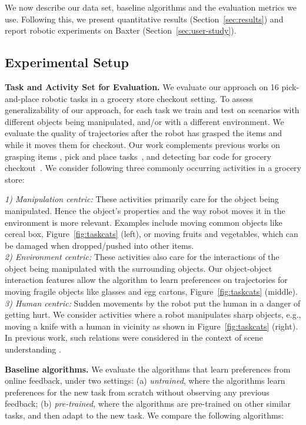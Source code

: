 We now describe our data set, baseline algorithms and the evaluation metrics we use. Following this, we present quantitative results (Section~\ref{sec:results}) 
and report robotic experiments on Baxter (Section~\ref{sec:user-study}). 

\subsection{Experimental Setup}

\textbf{Task and Activity Set for Evaluation.} We evaluate our approach on 16 pick-and-place robotic tasks in a grocery store checkout setting. To assess generalizability of our approach, for each task we train and test on scenarios with different objects being manipulated, and/or with a different environment. We evaluate the quality of trajectories after the robot has grasped the items and while it moves them for checkout. Our work complements previous works on grasping items \citep{saxena2008roboticgrasping,lenz2013_deeplearning_roboticgrasp}, pick and place tasks~\citep{jiang2012placingobjects}, and detecting bar code for grocery checkout~\citep{Klingbeil11}. We consider following three commonly occurring activities in a grocery store:

 \emph{1) Manipulation centric:} These activities primarily care for the object being manipulated. Hence the object's properties and the way robot moves it in the environment is more relevant. Examples include moving common objects like cereal box, Figure~\ref{fig:taskcats} (left), or moving fruits and vegetables, which can be damaged when dropped/pushed into other items.\\
\emph{2) Environment centric:} These activities also care for the interactions of the object being manipulated with the surrounding objects. Our object-object interaction features allow the algorithm to learn preferences on trajectories for moving fragile objects like glasses and egg cartons, Figure~\ref{fig:taskcats} (middle).\\
\emph{3) Human centric:} Sudden movements by the robot put the human in a danger of getting hurt. We consider activities where a robot manipulates sharp objects, e.g., moving a knife with a human in vicinity as shown in Figure~\ref{fig:taskcats} (right). In previous work, such relations were considered in the context of scene understanding \cite{jiang2012humancontext,jiang-hallucinatinghumans-labeling3dscenes-cvpr2013}.

\textbf{Baseline algorithms.} We evaluate the algorithms that learn preferences from online feedback, under two settings: (a) \emph{untrained}, where the algorithms learn preferences for the new task from scratch without observing any previous feedback; (b) \emph{pre-trained}, where the algorithms are pre-trained on other similar tasks, and then adapt to the new task. We compare the following algorithms:

